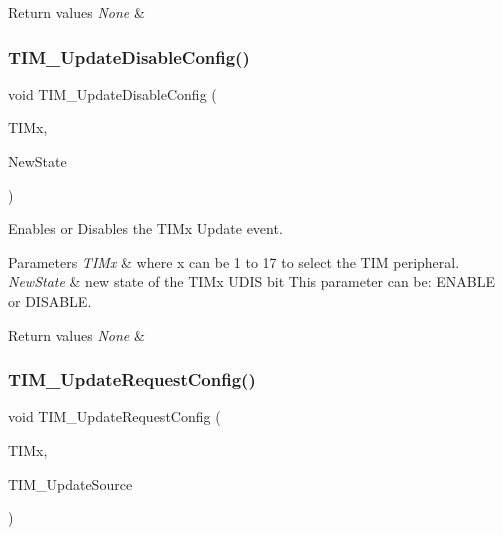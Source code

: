 \begin{DoxyRetVals}{Return values}
{\em None} & \\
\hline
\end{DoxyRetVals}
\mbox{\label{group___t_i_m___exported___functions_gace2384dd33e849a054f61b8e1fc7e7c3}} 
\subsubsection{\texorpdfstring{TIM\_UpdateDisableConfig()}{TIM\_UpdateDisableConfig()}}
{\footnotesize\ttfamily void T\+I\+M\+\_\+\+Update\+Disable\+Config (\begin{DoxyParamCaption}\item[{\mbox{\hyperlink{struct_t_i_m___type_def}{T\+I\+M\+\_\+\+Type\+Def}} $\ast$}]{T\+I\+Mx,  }\item[{\mbox{\hyperlink{group___exported__types_gac9a7e9a35d2513ec15c3b537aaa4fba1}{Functional\+State}}}]{New\+State }\end{DoxyParamCaption})}



Enables or Disables the T\+I\+Mx Update event. 


\begin{DoxyParams}{Parameters}
{\em T\+I\+Mx} & where x can be 1 to 17 to select the T\+IM peripheral. \\
\hline
{\em New\+State} & new state of the T\+I\+Mx U\+D\+IS bit This parameter can be\+: E\+N\+A\+B\+LE or D\+I\+S\+A\+B\+LE. \\
\hline
\end{DoxyParams}

\begin{DoxyRetVals}{Return values}
{\em None} & \\
\hline
\end{DoxyRetVals}
\mbox{\label{group___t_i_m___exported___functions_ga1d7a8f952e209de142499e67a653fc1f}} 
\subsubsection{\texorpdfstring{TIM\_UpdateRequestConfig()}{TIM\_UpdateRequestConfig()}}
{\footnotesize\ttfamily void T\+I\+M\+\_\+\+Update\+Request\+Config (\begin{DoxyParamCaption}\item[{\mbox{\hyperlink{struct_t_i_m___type_def}{T\+I\+M\+\_\+\+Type\+Def}} $\ast$}]{T\+I\+Mx,  }\item[{uint16\+\_\+t}]{T\+I\+M\+\_\+\+Update\+Source }\end{DoxyParamCaption})}



